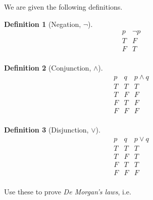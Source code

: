 \documentclass[addpoints]{exam}
\theoremstyle{definition}
\newtheorem{definition}{Definition}[section]
\theoremstyle{claim}
\begin{document}
\begin{questions}
  \question[5] We are given the following definitions.

\begin{definition}[Negation, $\neg$]
  \[
  \begin{array}{c||c}
    p & \neg p\\
    \hline
    T & F \\
    F & T \\
  \end{array}
  \]
\end{definition}

\begin{definition}[Conjunction, $\land$]
  \[
  \begin{array}{c|c||c}
    p & q & p \land q\\
    \hline
    T & T & T \\
    T & F & F \\
    F & T & F \\
    F & F & F \\
  \end{array}
  \]
\end{definition}

\begin{definition}[Disjunction, $\lor$]
  \[
  \begin{array}{c|c||c}
    p & q & p \lor q\\
    \hline
    T & T & T \\
    T & F & T \\
    F & T & T \\
    F & F & F \\
  \end{array}
  \]
\end{definition}

Use these to prove \textit{De Morgan's laws}, i.e.
\begin{solution}
    
\end{solution}
\end{questions}
\end{document}
